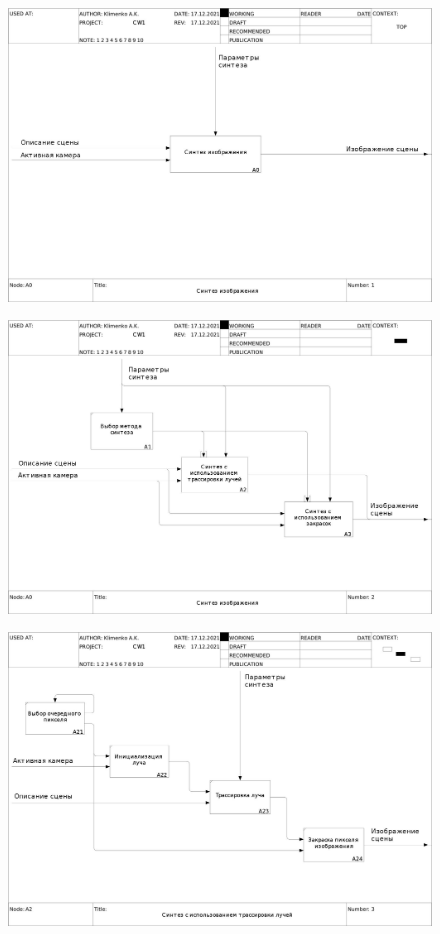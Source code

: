 \begin{figure}
    \centering
    \includegraphics[width=\linewidth,height=0.85\textheight,keepaspectratio]{idef0/01_A0.jpg}
\end{figure}

\begin{figure}
    \centering
    \includegraphics[width=\linewidth,height=0.85\textheight,keepaspectratio]{idef0/02_A0.jpg}
\end{figure}

\begin{figure}
    \centering
    \includegraphics[width=\linewidth,height=0.85\textheight,keepaspectratio]{idef0/03_A2.jpg}
\end{figure}

